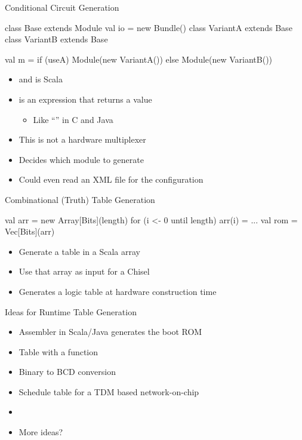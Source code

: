 \begin{frame}[fragile]{Conditional Circuit Generation}
\begin{chisel}
class Base extends Module { val io = new Bundle() }
class VariantA extends Base { }
class VariantB extends Base { }

val m = if (useA) Module(new VariantA())
        else Module(new VariantB())
\end{chisel}
\begin{itemize}
\item {} and  is Scala
\item {} is an expression that returns a value
\begin{itemize}
\item Like ``'' in C and Java
\end{itemize}
\item This is not a hardware multiplexer
\item Decides which module to generate
\item Could even read an XML file for the configuration
\end{itemize}
\end{frame}



\begin{frame}[fragile]{Combinational (Truth) Table Generation}
\begin{chisel}
val arr = new Array[Bits](length)
for (i <- 0 until length) {
  arr(i) = ...
}
val rom = Vec[Bits](arr)
\end{chisel}
\begin{itemize}
\item Generate a table in a Scala array
\item Use that array as input for a Chisel 
\item Generates a logic table at hardware construction time
\end{itemize}
\end{frame}

\begin{frame}[fragile]{Ideas for Runtime Table Generation}
\begin{itemize}
\item Assembler in Scala/Java generates the boot ROM
\item Table with a  function
\item Binary to BCD conversion
\item Schedule table for a TDM based network-on-chip
\item 
\item More ideas?
\end{itemize}
\end{frame}

